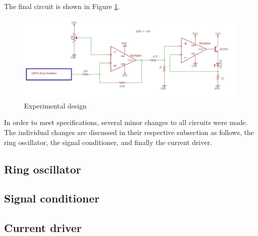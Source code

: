 
The final circuit is shown in Figure \ref{fig:finalexperimentalschem}.

\begin{figure}[H]
	\centering
	\includegraphics[width=0.7\linewidth]{ExperimentalImplementation/FINAlexperimentalSchem}
	\caption[Final circuit]{Experimental design}
	\label{fig:finalexperimentalschem}
\end{figure}

In order to meet specifications, several minor changes to all circuits were made. The individual changes are discussed in their respective subsection as follows, the ring oscillator, the signal conditioner, and finally the current driver.


\subsection{Ring oscillator}



\subsection{Signal conditioner}


\subsection{Current driver}

	
